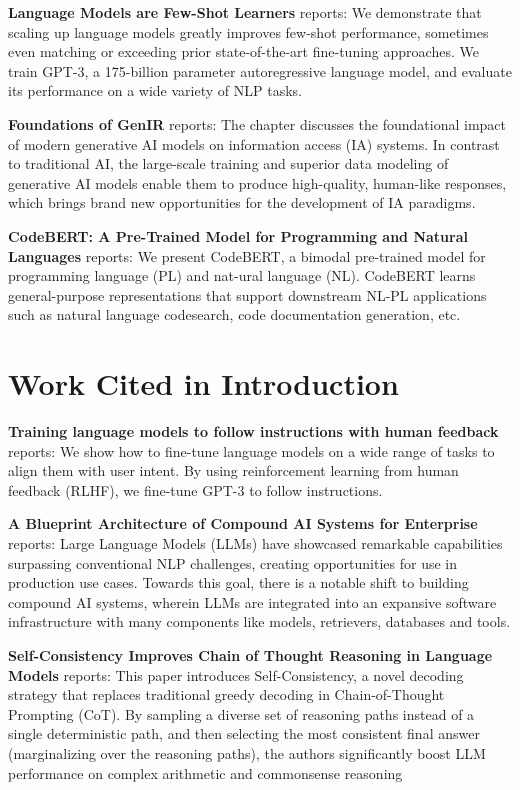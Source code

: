 \documentclass[10pt,twocolumn,letterpaper]{article}
\begin{document}
\textbf{Language Models are Few-Shot Learners} \cite{arxiv_2005_14165} reports: We demonstrate that scaling up language models greatly improves few-shot performance, sometimes even matching or exceeding prior state-of-the-art fine-tuning approaches. We train GPT-3, a 175-billion parameter autoregressive language model, and evaluate its performance on a wide variety of NLP tasks.

\textbf{Foundations of GenIR} \cite{arxiv_2501_02842} reports: The chapter discusses the foundational impact of modern generative AI models on information access (IA) systems. In contrast to traditional AI, the large-scale training and superior data modeling of generative AI models enable them to produce high-quality, human-like responses, which brings brand new opportunities for the development of IA paradigms.

\textbf{CodeBERT: A Pre-Trained Model for Programming and Natural Languages} \cite{arxiv_2002_08155} reports: We present CodeBERT, a bimodal pre-trained model for programming language (PL) and nat-ural language (NL). CodeBERT learns general-purpose representations that support downstream NL-PL applications such as natural language codesearch, code documentation generation, etc.


\section{Work Cited in Introduction}


\textbf{Training language models to follow instructions with human feedback} \cite{arxiv_2203_02155} reports: We show how to fine-tune language models on a wide range of tasks to align them with user intent. By using reinforcement learning from human feedback (RLHF), we fine-tune GPT-3 to follow instructions.

\textbf{A Blueprint Architecture of Compound AI Systems for Enterprise} \cite{arxiv_2406_00584} reports: Large Language Models (LLMs) have showcased remarkable capabilities surpassing conventional NLP challenges, creating opportunities for use in production use cases. Towards this goal, there is a notable shift to building compound AI systems, wherein LLMs are integrated into an expansive software infrastructure with many components like models, retrievers, databases and tools.

\textbf{Self-Consistency Improves Chain of Thought Reasoning in Language Models} \cite{arxiv_2203_11171} reports: This paper introduces Self-Consistency, a novel decoding strategy that replaces traditional greedy decoding in Chain-of-Thought Prompting (CoT). By sampling a diverse set of reasoning paths instead of a single deterministic path, and then selecting the most consistent final answer (marginalizing over the reasoning paths), the authors significantly boost LLM performance on complex arithmetic and commonsense reasoning 
\end{document}

